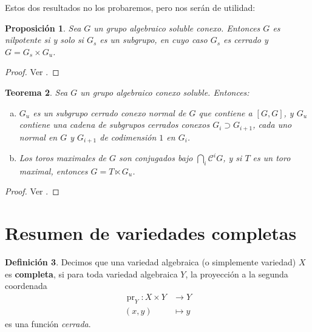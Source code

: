 \documentclass[spanish,10pt]{amsart}
\newtheorem{theorem}{Teorema}[section]
\newtheorem{proposition}[theorem]{Proposición}
\theoremstyle{definition}
\newtheorem{definition}[theorem]{Definición}
\theoremstyle{remark}
\numberwithin{equation}{section}
\begin{document}
Estos dos resultados no los probaremos, pero nos serán de utilidad:

\begin{proposition}\label{proposition:19.2}
Sea $G$ un grupo algebraico soluble conexo. Entonces $G$ es nilpotente si y solo si $G_s$ es un subgrupo, en cuyo caso $G_s$ es cerrado y $G = G_s \times G_u$.
\end{proposition}
\begin{proof}
Ver \cite[\S 19.2]{humphreys2012linearAlgebraicGroups}.
\end{proof}

\begin{theorem}\label{th:19.3}
Sea $G$ un grupo algebraico conexo soluble. Entonces:
\begin{enumerate}[(a)]
\item $G_u$ es un subgrupo cerrado conexo normal de $G$ que contiene a $[G,G]$, y $G_u$ contiene una cadena de subgrupos cerrados conexos $G_i \supset G_{i+1}$, cada uno normal en $G$ y $G_{i+1}$ de codimensión $1$ en $G_i$.
\item Los toros maximales de $G$ son conjugados bajo $\bigcap_i \mathcal C^i G$, y si $T$ es un toro maximal, entonces $G = T \ltimes G_u$.
\end{enumerate}
\end{theorem}
\begin{proof}
Ver \cite[\S 19.3]{humphreys2012linearAlgebraicGroups}.
\end{proof}






























\section{Resumen de variedades completas}

\begin{definition}
Decimos que una variedad algebraica (o simplemente variedad) $X$ es \textbf{completa}, si para toda variedad algebraica $Y$, la proyección a la segunda coordenada
\begin{align*}
\operatorname{pr}_Y : X \times Y &\longrightarrow Y \\
(x,y) &\longmapsto y
\end{align*}
es una función \textit{cerrada}.
\end{definition}
\end{document}
